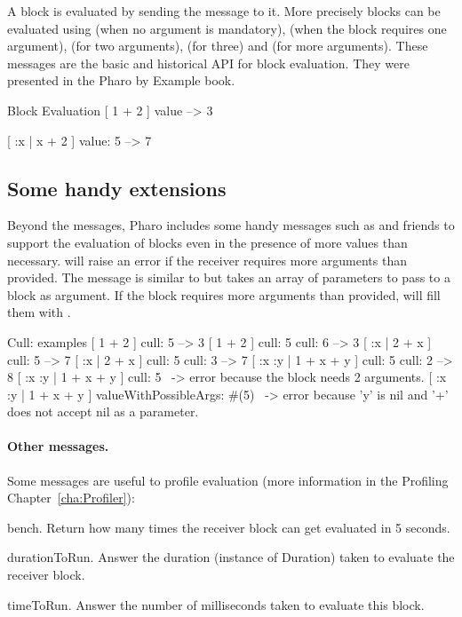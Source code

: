 \documentclass[a4paper,10pt,twoside]{book}
\begin{document}
 A block is evaluated by sending the  message to it. More precisely blocks can be evaluated using  (when no argument is mandatory),  (when the block requires one argument),  (for two arguments),  (for three) and  (for more arguments). These messages are the basic and historical API for block evaluation. They were presented in the Pharo by Example book.

\begin{code}{Block Evaluation}
[ 1 + 2 ] value --> 3

[ :x | x + 2 ] value: 5 --> 7
\end{code}

\subsection{Some handy extensions}

Beyond the  messages, Pharo includes some handy messages
such as  and friends to support the evaluation of blocks even
in the presence of more values than necessary.  will raise
an error if the receiver requires more arguments than provided. The
 message is similar to  but takes
an array of parameters to pass to a block as argument. If the block
requires more arguments than provided, 
will fill them with .

\begin{code}{Cull: examples}
[ 1 + 2 ] cull: 5 --> 3
[ 1 + 2 ] cull: 5 cull: 6 --> 3
[ :x | 2 + x ] cull: 5 --> 7
[ :x | 2 + x ] cull: 5 cull: 3 --> 7
[ :x :y | 1 + x + y ] cull: 5 cull: 2 --> 8
[ :x :y | 1 + x + y ] cull: 5 ~-> error because the block needs 2 arguments.
[ :x :y | 1 + x + y ] valueWithPossibleArgs: #(5)
                      ~-> error because 'y' is nil and '+' does not accept nil as a parameter.
\end{code}


\paragraph{Other messages.}

Some messages are useful to profile evaluation (more information in the Profiling Chapter~\ref{cha:Profiler}):

\begin{description}
\item{\textsf{bench}}. Return how many times the receiver block can get evaluated in 5 seconds.

\item{\textsf{durationToRun}}. Answer the duration (instance of Duration) taken to evaluate the receiver block.

\item{\textsf{timeToRun}}. Answer the number of milliseconds taken to evaluate this block.
\end{description}
\end{document}
